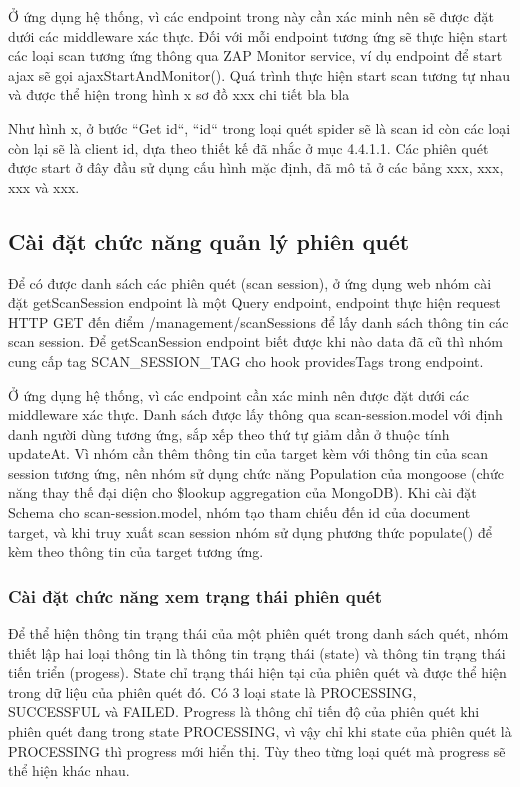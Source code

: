 Ở ứng dụng hệ thống, vì các endpoint trong này cần xác minh nên sẽ được đặt dưới các middleware xác thực. Đối với mỗi endpoint tương ứng sẽ thực hiện start các loại scan tương ứng thông qua ZAP Monitor service, ví dụ endpoint để start ajax sẽ gọi ajaxStartAndMonitor(). Quá trình thực hiện start scan tương tự nhau và được thể hiện trong hình x sơ đồ xxx chi tiết bla bla


Như hình x, ở bước “Get id“, “id“ trong loại quét spider sẽ là scan id còn các loại còn lại sẽ là client id, dựa theo thiết kế đã nhắc ở mục 4.4.1.1. Các phiên quét được start ở đây đầu sử dụng cấu hình mặc định, đã mô tả ở các bảng xxx, xxx, xxx và xxx.

\subsection{Cài đặt chức năng quản lý phiên quét}

\tab Để có được danh sách các phiên quét (scan session), ở ứng dụng web nhóm cài đặt getScanSession endpoint là một Query endpoint, endpoint thực hiện request HTTP GET đến điểm /management/scanSessions để lấy danh sách thông tin các scan session. Để getScanSession endpoint biết được khi nào data đã cũ thì nhóm cung cấp tag SCAN\_SESSION\_TAG cho hook providesTags trong endpoint.

Ở ứng dụng hệ thống, vì các endpoint cần xác minh nên được đặt dưới các middleware xác thực. Danh sách được lấy thông qua scan-session.model với định danh người dùng tương ứng, sắp xếp theo thứ tự giảm dần ở thuộc tính updateAt. Vì nhóm cần thêm thông tin của target kèm với thông tin của scan session tương ứng, nên nhóm sử dụng chức năng Population của mongoose (chức năng thay thế đại diện cho \$lookup aggregation của MongoDB). Khi cài đặt Schema cho scan-session.model, nhóm tạo tham chiếu đến id của document target, và khi truy xuất scan session nhóm sử dụng phương thức populate() để kèm theo thông tin của target tương ứng.

\subsubsection{Cài đặt chức năng xem trạng thái phiên quét}

\tab Để thể hiện thông tin trạng thái của một phiên quét trong danh sách quét, nhóm thiết lập hai loại thông tin là thông tin trạng thái (state) và thông tin trạng thái tiến triển (progess). State chỉ trạng thái hiện tại của phiên quét và được thể hiện trong dữ liệu của phiên quét đó. Có 3 loại state là PROCESSING, SUCCESSFUL và FAILED. Progress là thông chỉ tiến độ của phiên quét khi phiên quét đang trong state PROCESSING, vì vậy chỉ khi state của phiên quét là PROCESSING thì progress mới hiển thị. Tùy theo từng loại quét mà progress sẽ thể hiện khác nhau.

